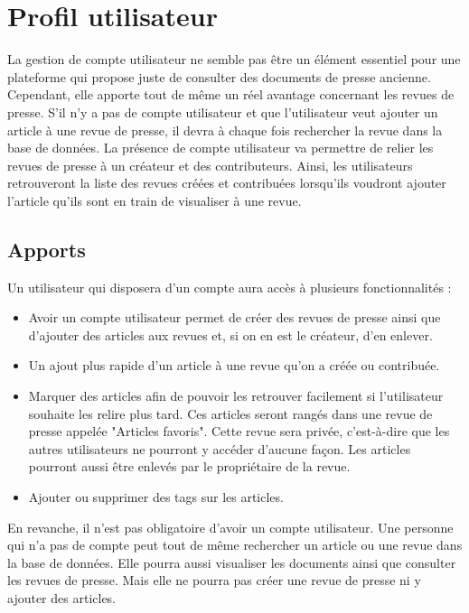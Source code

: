 \section{Profil utilisateur}
\label{sec:profil}

La gestion de compte utilisateur ne semble pas être un élément essentiel pour une plateforme qui propose juste de consulter des documents de presse ancienne. Cependant, elle apporte tout de même un réel avantage concernant les revues de presse.
S'il n'y a pas de compte utilisateur et que l'utilisateur veut ajouter un article à une revue de presse, il devra à chaque fois rechercher la revue dans la base de données.
La présence de compte utilisateur va permettre de relier les revues de presse à un créateur et des contributeurs. Ainsi, les utilisateurs retrouveront la liste des revues créées et contribuées lorsqu'ils voudront ajouter l'article qu'ils sont en train de visualiser à une revue.


\subsection{Apports}
\label{apport}
 

Un utilisateur qui disposera d'un compte aura accès à plusieurs fonctionnalités :

\begin{itemize}
  \item Avoir un compte utilisateur permet de créer des revues de presse ainsi que d'ajouter des articles aux revues et, si on en est le créateur, d'en enlever.
  \item Un ajout plus rapide d'un article à une revue qu'on a créée ou contribuée.
  \item Marquer des articles afin de pouvoir les retrouver facilement si l'utilisateur souhaite les relire plus tard. Ces articles seront rangés dans une revue de presse appelée "Articles favoris". Cette revue sera privée, c'est-à-dire que les autres utilisateurs ne pourront y accéder d'aucune façon. Les articles pourront aussi être enlevés par le propriétaire de la revue.
	\item Ajouter ou supprimer des tags sur les articles.
\end{itemize}

En revanche, il n'est pas obligatoire d'avoir un compte utilisateur. Une personne qui n'a pas de compte peut tout de même rechercher un article ou une revue dans la base de données. Elle pourra aussi visualiser les documents ainsi que consulter les revues de presse. Mais elle ne pourra pas créer une revue de presse ni y ajouter des articles.


